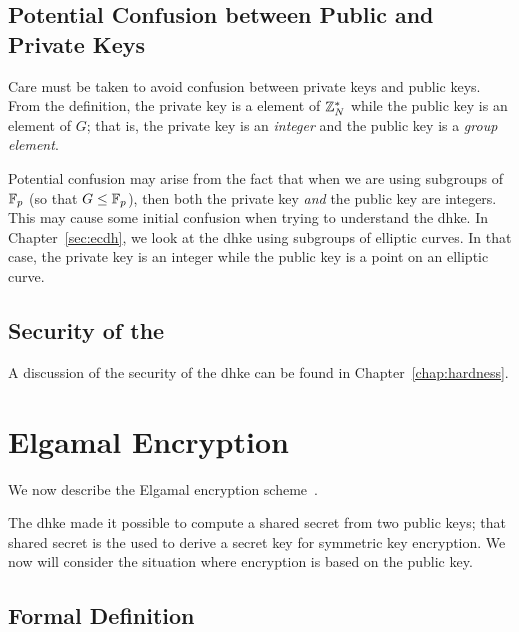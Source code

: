 \subsection{Potential Confusion between Public and Private Keys}

Care must be taken to avoid confusion between private keys
and public keys.
From the definition, the private key is a element of $\mathbb{Z}_{N}^{*}$
while the public key is an element of $G$;
that is, the private key is an \emph{integer}
and the public key is a \emph{group element}.

Potential confusion may arise from the fact that when we are
using \glspl{subgroup} of $\mathbb{F}_{p}$ (so that $G\le \mathbb{F}_{p}$),
then both the private key \emph{and} the public key are integers.
This may cause some initial confusion when trying to understand the
\gls{dhke}.
In Chapter~\ref{sec:ecdh}, we look at the \gls{dhke}
using \glspl{subgroup} of \glspl{elliptic curve}.
In that case, the private key is an integer while the public key
is a point on an \gls{elliptic curve}.

\subsection{Security of the }

A discussion of the security of the \gls{dhke} can be found
in Chapter~\ref{chap:hardness}.



\section{Elgamal Encryption}
\label{sec:public_elgamal_encryption}

We now describe the Elgamal \gls{encryption scheme}~\cite{elgamal1985public}.

The \gls{dhke} made it possible to compute a \gls{shared secret}
from two public keys;
that \gls{shared secret} is the used to derive a secret key
for \gls{symmetric key encryption}.
We now will consider the situation where encryption is based
on the public key.

\subsection{Formal Definition}

